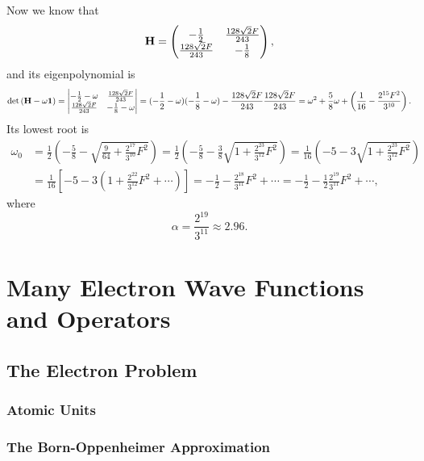 \documentclass[a4paper]{book}
\newcounter{solution}[chapter]
\renewcommand\det[1]{\mathrm{det\left(#1\right)}}
\newcommand{\I}{{\bf 1}}
\begin{document}
\begin{solution}
 	Now we know that
 	\[
 		{\bf H} = \begin{pmatrix}
 			-\frac{1}{2} & \frac{ 128\sqrt{2} F }{ 243 } \\
 			\frac{ 128\sqrt{2} F }{ 243 } & -\frac{1}{8}
 		\end{pmatrix},
 	\]
 	and its eigenpolynomial is
 	\[
 		\det{{\bf H} - \omega \I} = \begin{vmatrix}
 			-\frac{1}{2} - \omega & \frac{ 128\sqrt{2} F }{ 243 } \\
 			\frac{ 128\sqrt{2} F }{ 243 } & -\frac{1}{8} - \omega
 		\end{vmatrix} = ( -\frac{1}{2} - \omega ) ( -\frac{1}{8} - \omega ) - \frac{ 128\sqrt{2} F }{ 243 } \frac{ 128\sqrt{2} F }{ 243 } = \omega^2 + \frac{5}{8} \omega + \left( \frac{1}{16} - \frac{ 2^{15} F^2 }{ 3^{10} } \right) .
 	\]
	Its lowest root is
	\begin{align*}
		\omega_0 &= \frac{1}{2} \left( - \frac{5}{8} - \sqrt{ \frac{9}{64} + \frac{ 2^{17} }{ 3^{10} } F^2 } \right) = \frac{1}{2} \left( - \frac{5}{8} - \frac{3}{8} \sqrt{ 1 + \frac{ 2^{23} }{ 3^{12} } F^2 } \right) = \frac{1}{16} \left( - 5 - 3 \sqrt{ 1 + \frac{ 2^{23} }{ 3^{12} } F^2 } \right) \\
		&= \frac{1}{16} \left[ - 5 - 3 \left( 1 + \frac{ 2^{22} }{ 3^{12} } F^2 + \cdots \right) \right] = - \frac{1}{2} - \frac{ 2^{18} }{ 3^{11} } F^2 + \cdots = - \frac{1}{2} - \frac{1}{2} \frac{ 2^{19} }{ 3^{11} } F^2 + \cdots ,
	\end{align*}
	where
	\[
		\alpha = \frac{ 2^{19} }{ 3^{11} } \approx 2.96.
	\]
	
	\end{solution}
	
	\clearpage

	\chapter{Many Electron Wave Functions and Operators}
	
	\section{The Electron Problem}
	
	\subsection{Atomic Units}
	
	\subsection{The Born-Oppenheimer Approximation}
	
\end{document}

